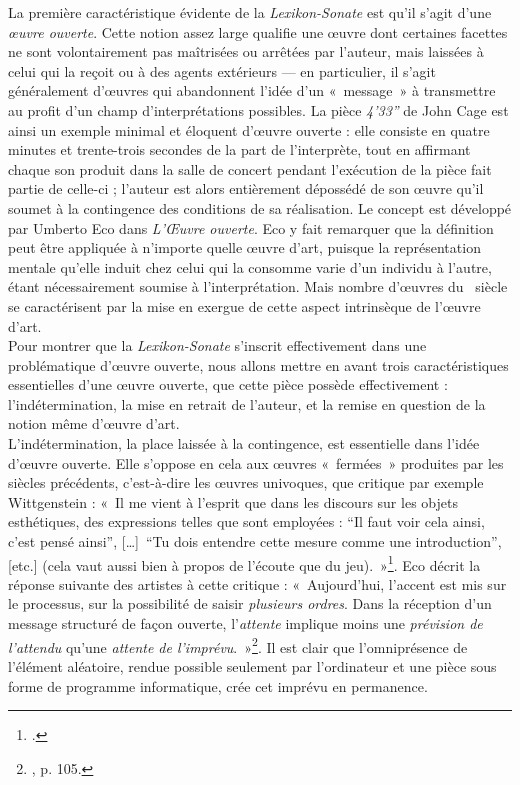 \documentclass[a4paper,12pt]{article}
\newcommand{\guill}[1]{«~#1~»}
\newcommand{\guilldeux}[1]{“#1”}
\newcommand{\tpp}[0]{[\dots]}
\begin{document}
La première caractéristique évidente de la \emph{Lexikon-Sonate} est qu'il s'agit d'une \emph{œuvre ouverte}. Cette notion assez large qualifie une œuvre dont certaines facettes ne sont volontairement pas maîtrisées ou arrêtées par l'auteur, mais laissées à celui qui la reçoit ou à des agents extérieurs --- en particulier, il s'agit généralement d'œuvres qui abandonnent l'idée d'un \guill{message} à transmettre au profit d'un champ d'interprétations possibles. La pièce \emph{4'33''} de John Cage est ainsi un exemple minimal et éloquent d'œuvre ouverte : elle consiste en quatre minutes et trente-trois secondes de la part de l'interprète, tout en affirmant chaque son produit dans la salle de concert pendant l'exécution de la pièce fait partie de celle-ci ; l'auteur est alors entièrement dépossédé de son œuvre qu'il soumet à la contingence des conditions de sa réalisation. Le concept est développé par Umberto Eco dans \emph{L'Œuvre ouverte}. Eco y fait remarquer que la définition peut être appliquée à n'importe quelle œuvre d'art, puisque la représentation mentale qu'elle induit chez celui qui la consomme varie d'un individu à l'autre, étant nécessairement soumise à l'interprétation. Mais nombre d'œuvres du \XXe~siècle se caractérisent par la mise en exergue de cette aspect intrinsèque de l'œuvre d'art. \\
Pour montrer que la \emph{Lexikon-Sonate} s'inscrit effectivement dans une problématique d'œuvre ouverte, nous allons mettre en avant trois caractéristiques essentielles d'une œuvre ouverte, que cette pièce possède effectivement : l'indétermination, la mise en retrait de l'auteur, et la remise en question de la notion même d'œuvre d'art. \\
L'indétermination, la place laissée à la contingence, est essentielle dans l'idée d'œuvre ouverte. Elle s'oppose en cela aux œuvres \guill{fermées} produites par les siècles précédents, c'est-à-dire les œuvres univoques, que critique par exemple Wittgenstein : \guill{Il me vient à l'esprit que dans les discours sur les objets esthétiques, des expressions telles que  sont employées : \guilldeux{Il faut voir cela ainsi, c'est pensé ainsi}, \tpp~\guilldeux{Tu dois entendre cette mesure comme une introduction}, [etc.] (cela vaut aussi bien à propos de l'écoute que du jeu).}\footnote{\cite{wittgenstein}.}. Eco décrit la réponse suivante des artistes à cette critique : \guill{Aujourd'hui, l'accent est mis sur le processus, sur la possibilité de saisir \emph{plusieurs ordres}. Dans la réception d'un message structuré de façon ouverte, l'\emph{attente} implique moins une \emph{prévision de l'attendu} qu'une \emph{attente de l'imprévu}.}\footnote{\cite{eco1962opera}, p. 105.}. Il est clair que l'omniprésence de l'élément aléatoire, rendue possible seulement par l'ordinateur et une pièce sous forme de programme informatique, crée cet imprévu en permanence. \\
\end{document}
